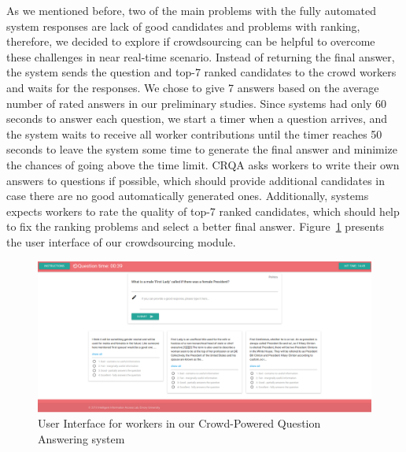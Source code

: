 As we mentioned before, two of the main problems with the fully automated system responses are lack of good candidates and problems with ranking, therefore, we decided to explore if crowdsourcing can be helpful to overcome these challenges in near real-time scenario.
Instead of returning the final answer, the system sends the question and top-7 ranked candidates to the crowd workers and waits for the responses.
We chose to give 7 answers based on the average number of rated answers in our preliminary studies.
Since systems had only 60 seconds to answer each question, we start a timer when a question arrives, and the system waits to receive all worker contributions until the timer reaches 50 seconds to leave the system some time to generate the final answer and minimize the chances of going above the time limit.
CRQA asks workers to write their own answers to questions if possible, which should provide additional candidates in case there are no good automatically generated ones.
Additionally, systems expects workers to rate the quality of top-7 ranked candidates, which should help to fix the ranking problems and select a better final answer.
Figure~\ref{figure:crowdsourcing:crowd_ui} presents the user interface of our crowdsourcing module.

\begin{figure}[h!t]
	\centering
	\includegraphics[width=\textwidth]{img/crqa_crowd_ui}
	\caption{User Interface for workers in our Crowd-Powered Question Answering system}
	\label{figure:crowdsourcing:crowd_ui}
\end{figure}


